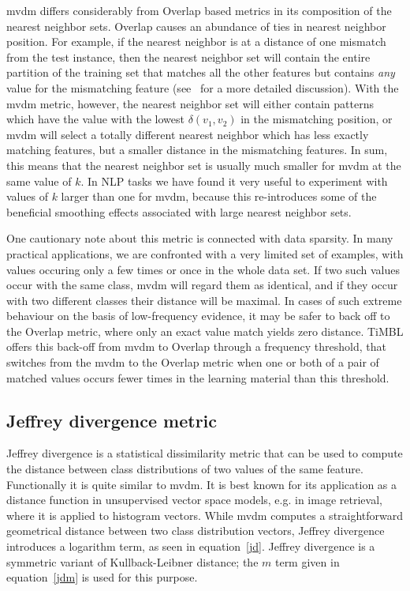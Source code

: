 \documentclass{report}
\begin{document}
{\sc mvdm} differs considerably from Overlap based metrics in its
composition of the nearest neighbor sets. Overlap causes an abundance
of ties in nearest neighbor position. For example, if the nearest
neighbor is at a distance of one mismatch from the test instance, then
the nearest neighbor set will contain the entire partition of the
training set that matches all the other features but contains {\em
any} value for the mismatching feature (see~ for a
more detailed discussion). With the {\sc mvdm} metric, however, the
nearest neighbor set will either contain patterns which have the value
with the lowest $\delta(v_{1}, v_{2})$ in the mismatching position, or
{\sc mvdm} will select a totally different nearest neighbor which has
less exactly matching features, but a smaller distance in the
mismatching features. In sum, this means that the nearest neighbor set
is usually much smaller for {\sc mvdm} at the same value of $k$. In
NLP tasks we have found it very useful to experiment with values of
$k$ larger than one for {\sc mvdm}, because this re-introduces some of
the beneficial smoothing effects associated with large nearest
neighbor sets.

One cautionary note about this metric is connected with data
sparsity. In many practical applications, we are confronted with a
very limited set of examples, with values occuring only a few times or
once in the whole data set. If two such values occur with the same
class, {\sc mvdm} will regard them as identical, and if they occur
with two different classes their distance will be maximal. In cases of
such extreme behaviour on the basis of low-frequency evidence, it may
be safer to back off to the Overlap metric, where only an exact value
match yields zero distance. TiMBL offers this back-off from {\sc mvdm}
to Overlap through a frequency threshold, that switches from the {\sc
mvdm} to the Overlap metric when one or both of a pair of matched
values occurs fewer times in the learning material than this
threshold.

\subsection{Jeffrey divergence metric}
\label{jeffrey}

Jeffrey divergence is a statistical dissimilarity metric that can be
used to compute the distance between class distributions of two values
of the same feature. Functionally it is quite similar to {\sc
  mvdm}. It is best known for its application as a distance function
in unsupervised vector space models, e.g. in image retrieval, where it
is applied to histogram vectors. While {\sc mvdm} computes a
straightforward geometrical distance between two class distribution
vectors, Jeffrey divergence introduces a logarithm term, as seen in
equation~\ref{jd}. Jeffrey divergence is a symmetric variant of
Kullback-Leibner distance; the $m$ term given in equation~\ref{jdm} is
used for this purpose.
\end{document}
